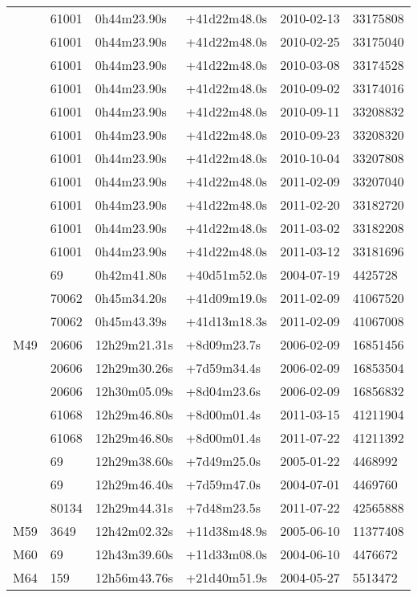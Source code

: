 \begin{table*}
\begin{center}
\begin{tabular}{llllll}
   & 61001 & 0h44m23.90s & +41d22m48.0s & 2010-02-13 & 33175808\\
   & 61001 & 0h44m23.90s & +41d22m48.0s & 2010-02-25 & 33175040\\
   & 61001 & 0h44m23.90s & +41d22m48.0s & 2010-03-08 & 33174528\\
   & 61001 & 0h44m23.90s & +41d22m48.0s & 2010-09-02 & 33174016\\
   & 61001 & 0h44m23.90s & +41d22m48.0s & 2010-09-11 & 33208832\\
   & 61001 & 0h44m23.90s & +41d22m48.0s & 2010-09-23 & 33208320\\
   & 61001 & 0h44m23.90s & +41d22m48.0s & 2010-10-04 & 33207808\\
   & 61001 & 0h44m23.90s & +41d22m48.0s & 2011-02-09 & 33207040\\
   & 61001 & 0h44m23.90s & +41d22m48.0s & 2011-02-20 & 33182720\\
   & 61001 & 0h44m23.90s & +41d22m48.0s & 2011-03-02 & 33182208\\
   & 61001 & 0h44m23.90s & +41d22m48.0s & 2011-03-12 & 33181696\\
   & 69 & 0h42m41.80s & +40d51m52.0s & 2004-07-19 & 4425728\\
   & 70062 & 0h45m34.20s & +41d09m19.0s & 2011-02-09 & 41067520\\
   & 70062 & 0h45m43.39s & +41d13m18.3s & 2011-02-09 & 41067008\\
  M49 & 20606 & 12h29m21.31s & +8d09m23.7s & 2006-02-09 & 16851456\\
   & 20606 & 12h29m30.26s & +7d59m34.4s & 2006-02-09 & 16853504\\
   & 20606 & 12h30m05.09s & +8d04m23.6s & 2006-02-09 & 16856832\\
   & 61068 & 12h29m46.80s & +8d00m01.4s & 2011-03-15 & 41211904\\
   & 61068 & 12h29m46.80s & +8d00m01.4s & 2011-07-22 & 41211392\\
   & 69 & 12h29m38.60s & +7d49m25.0s & 2005-01-22 & 4468992\\
   & 69 & 12h29m46.40s & +7d59m47.0s & 2004-07-01 & 4469760\\
   & 80134 & 12h29m44.31s & +7d48m23.5s & 2011-07-22 & 42565888\\
  M59 & 3649 & 12h42m02.32s & +11d38m48.9s & 2005-06-10 & 11377408\\
  M60 & 69 & 12h43m39.60s & +11d33m08.0s & 2004-06-10 & 4476672\\
  M64 & 159 & 12h56m43.76s & +21d40m51.9s & 2004-05-27 & 5513472\\

\end{tabular}
\end{center}
\end{table*}
